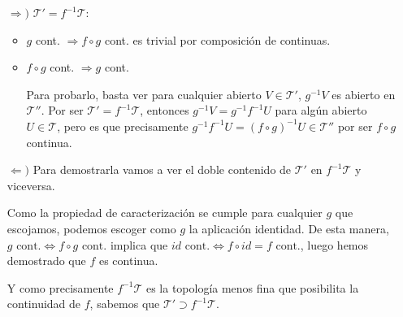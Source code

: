 \begin{demo}
\begin{itemize}
    \item[$\Rightarrow)$] $\mathcal{T}' = f^{-1}\mathcal{T}: $ 
    \begin{itemize}
        \item $g$ cont. $\Rightarrow f \circ g$ cont. es trivial por composición de continuas.
        \item $f \circ g$ cont. $\Rightarrow g$ cont.
        
        Para probarlo, basta ver para cualquier abierto $V \in \mathcal{T}'$, $g^{-1}V$ es abierto en $\mathcal{T}''$. Por ser $\mathcal{T}'=f^{-1}\mathcal{T}$, entonces $g^{-1}V = g^{-1} f^{-1} U$ para algún abierto $U\in \mathcal{T}$, pero es que precisamente $g^{-1} f^{-1} U = \left( f \circ g \right)^{-1} U \in \mathcal{T}''$ por ser $f\circ g$ continua.
    \end{itemize}

    \item[$\Leftarrow)$]
	Para demostrarla vamos a ver el doble contenido de $\mathcal{T}'$ en $f^{-1}\mathcal{T} $ y viceversa.
	
	Como la propiedad de caracterización se cumple para cualquier $g$ que escojamos, podemos escoger como $g$ la aplicación identidad. De esta manera, $g \text{ cont.} \Leftrightarrow f\circ g \text{ cont.}$ implica que $id \text{ cont.} \Leftrightarrow f\circ id = f \text{ cont.}$, luego hemos demostrado que $f$ es continua.
    \begin{figure}[H]
        \centering    
    \end{figure}
    Y como precisamente $f^{-1}\mathcal{T}$ es la topología menos fina que posibilita la continuidad de $f$, sabemos que $\mathcal{T}' \supset f^{-1}\mathcal{T}$. 
   

\end{itemize}
\end{demo}

